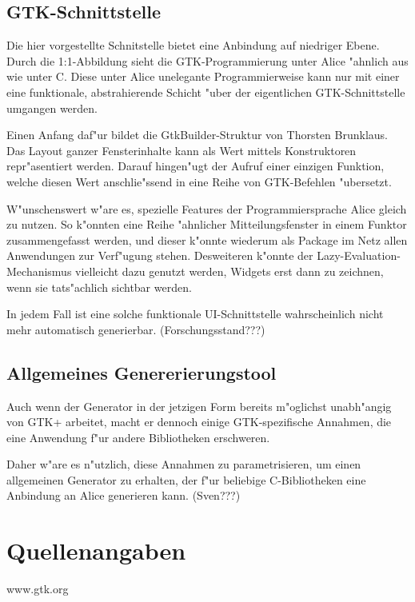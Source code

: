 \documentclass{article}
\begin{document}
\subsection{GTK-Schnittstelle}

Die hier vorgestellte Schnitstelle bietet eine Anbindung auf niedriger Ebene.
Durch die 1:1-Abbildung sieht die GTK-Programmierung unter Alice "ahnlich
aus wie unter C. Diese unter Alice unelegante Programmierweise kann
nur mit einer eine funktionale, abstrahierende Schicht "uber der
eigentlichen GTK-Schnittstelle umgangen werden.

Einen Anfang daf"ur bildet die GtkBuilder-Struktur von Thorsten Brunklaus.
Das Layout ganzer Fensterinhalte kann als Wert mittels Konstruktoren
repr"asentiert werden. Darauf hingen"ugt der Aufruf einer einzigen Funktion,
welche diesen Wert anschlie"ssend in eine Reihe von GTK-Befehlen "ubersetzt.

W"unschenswert w"are es, spezielle Features der Programmiersprache Alice
gleich zu nutzen. So k"onnten eine Reihe "ahnlicher Mitteilungsfenster
in einem Funktor zusammengefasst werden, und dieser k"onnte wiederum als
Package im Netz allen Anwendungen zur Verf"ugung stehen. Desweiteren k"onnte
der Lazy-Evaluation-Mechanismus vielleicht dazu genutzt werden, Widgets erst
dann zu zeichnen, wenn sie tats"achlich sichtbar werden.

In jedem Fall ist eine solche funktionale UI-Schnittstelle wahrscheinlich
nicht mehr automatisch generierbar. (Forschungsstand???)

\subsection{Allgemeines Genererierungstool}

Auch wenn der Generator in der jetzigen Form bereits m"oglichst unabh"angig
von GTK+ arbeitet, macht er dennoch einige GTK-spezifische Annahmen, die
eine Anwendung f"ur andere Bibliotheken erschweren.

Daher w"are es n"utzlich, diese Annahmen zu parametrisieren, um einen
allgemeinen Generator zu erhalten, der f"ur beliebige C-Bibliotheken
eine Anbindung an Alice generieren kann. (Sven???)

\section{Quellenangaben}

www.gtk.org
\end{document}
